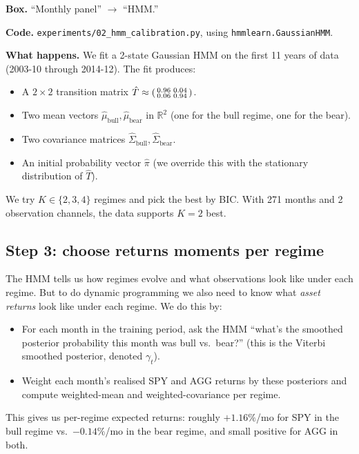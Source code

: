 \documentclass[11pt]{article}
\newcommand{\R}{\mathbb{R}}
\begin{document}
\textbf{Box.} ``Monthly panel'' $\to$ ``HMM.''

\textbf{Code.} \texttt{experiments/02\_hmm\_calibration.py}, using \texttt{hmmlearn.GaussianHMM}.

\textbf{What happens.} We fit a 2-state Gaussian HMM on the first 11 years of data (2003-10 through 2014-12). The fit produces:

\begin{itemize}
  \item A $2 \times 2$ transition matrix $\hat T \approx \begin{psmallmatrix} 0.96 & 0.04 \\ 0.06 & 0.94 \end{psmallmatrix}$.
  \item Two mean vectors $\hat \mu_{\text{bull}}, \hat \mu_{\text{bear}}$ in $\R^2$ (one for the bull regime, one for the bear).
  \item Two covariance matrices $\hat \Sigma_{\text{bull}}, \hat \Sigma_{\text{bear}}$.
  \item An initial probability vector $\hat \pi$ (we override this with the stationary distribution of $\hat T$).
\end{itemize}

We try $K \in \{2, 3, 4\}$ regimes and pick the best by BIC. With 271 months and 2 observation channels, the data supports $K = 2$ best.

\subsection{Step 3: choose returns moments per regime}

The HMM tells us how regimes evolve and what observations look like under each regime. But to do dynamic programming we also need to know what \emph{asset returns} look like under each regime. We do this by:

\begin{itemize}
  \item For each month in the training period, ask the HMM ``what's the smoothed posterior probability this month was bull vs.\ bear?'' (this is the Viterbi smoothed posterior, denoted $\gamma_t$).
  \item Weight each month's realised SPY and AGG returns by these posteriors and compute weighted-mean and weighted-covariance per regime.
\end{itemize}

This gives us per-regime expected returns: roughly $+1.16\%$/mo for SPY in the bull regime vs.\ $-0.14\%$/mo in the bear regime, and small positive for AGG in both.
\end{document}
